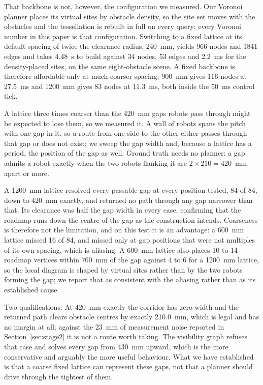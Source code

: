 That backbone is not, however, the configuration we measured. Our Voronoi
planner places its virtual sites by obstacle density, so the site set moves with
the obstacles and the tessellation is rebuilt in full on every query; every
Voronoi number in this paper is that configuration. Switching to a fixed lattice
at its default spacing of twice the clearance radius, 240~mm, yields 966 nodes
and 1841 edges and takes 4.48~s to build against 34 nodes, 53 edges and 2.2~ms
for the density-placed sites, on the same eight-obstacle scene. A fixed backbone
is therefore affordable only at much coarser spacing: 900~mm gives 116 nodes at
27.5~ms and 1200~mm gives 83 nodes at 11.3~ms, both inside the 50~ms control
tick.

A lattice three times coarser than the 420~mm gaps robots pass through might be
expected to lose them, so we measured it. A wall of robots spans the pitch with
one gap in it, so a route from one side to the other either passes through that
gap or does not exist; we sweep the gap width and, because a lattice has a
period, the position of the gap as well. Ground truth needs no planner: a gap
admits a robot exactly when the two robots flanking it are $2 \times 210 =
420$~mm apart or more.

A 1200~mm lattice resolved every passable gap at every position tested, 84 of
84, down to 420~mm exactly, and returned no path through any gap narrower than
that. Its clearance was half the gap width in every case, confirming that the
roadmap runs down the centre of the gap as the construction intends. Coarseness
is therefore not the limitation, and on this test it is an advantage: a 600~mm
lattice missed 16 of 84, and missed only at gap positions that were not
multiples of its own spacing, which is aliasing. A 600~mm lattice also places 10
to 14 roadmap vertices within 700~mm of the gap against 4 to 6 for a 1200~mm
lattice, so the local diagram is shaped by virtual sites rather than by the two
robots forming the gap; we report that as consistent with the aliasing rather
than as its established cause.

Two qualifications. At 420~mm exactly the corridor has zero width and the
returned path clears obstacle centres by exactly 210.0~mm, which is legal and
has no margin at all; against the 23~mm of measurement noise reported in
Section~\ref{sec:stage2} it is not a route worth taking. The visibility graph
refuses that case and solves every gap from 430~mm upward, which is the more
conservative and arguably the more useful behaviour. What we have established is
that a coarse fixed lattice can represent these gaps, not that a planner should
drive through the tightest of them.

